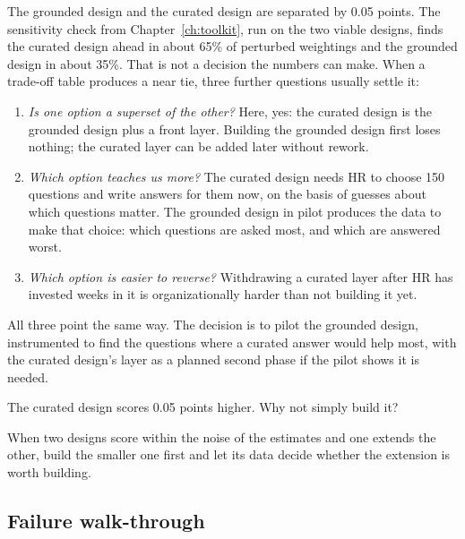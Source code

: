 The grounded design and the curated design are separated by 0.05 points. The sensitivity check from Chapter~\ref{ch:toolkit}, run on the two viable designs, finds the curated design ahead in about 65\% of perturbed weightings and the grounded design in about 35\%. That is not a decision the numbers can make. When a trade-off table produces a near tie, three further questions usually settle it:
\begin{enumerate}[itemsep=1pt]
  \item \emph{Is one option a superset of the other?} Here, yes: the curated design is the grounded design plus a front layer. Building the grounded design first loses nothing; the curated layer can be added later without rework.
  \item \emph{Which option teaches us more?} The curated design needs HR to choose 150 questions and write answers for them now, on the basis of guesses about which questions matter. The grounded design in pilot produces the data to make that choice: which questions are asked most, and which are answered worst.
  \item \emph{Which option is easier to reverse?} Withdrawing a curated layer after HR has invested weeks in it is organizationally harder than not building it yet.
\end{enumerate}

All three point the same way. The decision is to pilot the grounded design, instrumented to find the questions where a curated answer would help most, with the curated design's layer as a planned second phase if the pilot shows it is needed.

\begin{quickcheck}
The curated design scores 0.05 points higher. Why not simply build it?
\end{quickcheck}

\begin{principle}
When two designs score within the noise of the estimates and one extends the other, build the smaller one first and let its data decide whether the extension is worth building.
\end{principle}

\subsection{Failure walk-through}

